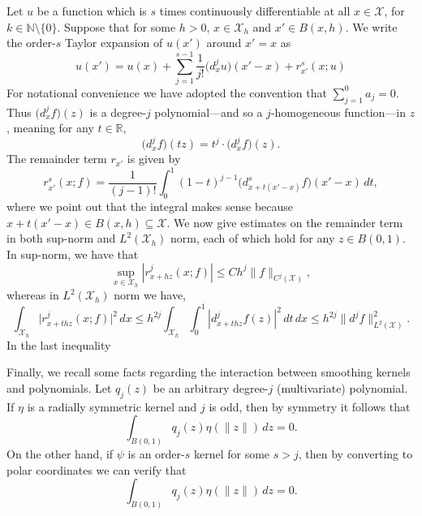 \documentclass[aos]{imsart}
\theoremstyle{plain}
\theoremstyle{definition}
\theoremstyle{remark}
\def\R{\mathbb{R}}
\newcommand{\mc}[1]{\mathcal{#1}}
\newcommand{\Reals}{\mathbb{R}} %
\newcommand{\1}{\mathbf{1}}
\begin{document}
Let $u$ be a function which is $s$ times continuously differentiable at all $x \in \mc{X}$, for $k \in \mathbb{N}\setminus\{0\}$. Suppose that for some $h > 0$, $x \in \mc{X}_{h}$ and $x' \in B(x,h)$. We write the order-$s$ Taylor expansion of $u(x')$ around $x' = x$ as
\begin{equation*}
u(x') = u(x) + \sum_{j = 1}^{s - 1} \frac{1}{j!}\bigl(d_x^{j}u\bigr)(x' - x) + r_{x'}^{s}(x;u)
\end{equation*}
For notational convenience we have adopted the convention that $\sum_{j = 1}^{0} a_j = 0$.  Thus $\bigl(d_x^{j}f\bigr)(z)$ is a degree-$j$ polynomial---and so a $j$-homogeneous function---in $z$, meaning for any $t \in \Reals$,
\begin{equation*}
\bigl(d_x^{j}f\bigr)(tz) = t^{j} \cdot \bigl(d_x^{j}f\bigr)(z).
\end{equation*}
The remainder term $r_{x'}$ is given by
\begin{equation*}
r_{x'}^s(x;f) = \frac{1}{(j - 1)!} \int_{0}^{1}(1 - t)^{j - 1} \bigl(d_{x + t(x' - x)}^{s}f\bigr)(x' - x) \,dt,
\end{equation*}
where we point out that the integral makes sense because $x + t(x' - x) \in B(x,h) \subseteq \mc{X}$. We now give estimates on the remainder term in both sup-norm and $L^2(\mc{X}_{h})$ norm, each of which hold for any $z \in B(0,1)$. In sup-norm, we have that 
\begin{equation*}
\sup_{x \in \mc{X}_{h}}|r_{x + hz}^j(x;f)| \leq C h^j \|f\|_{C^j(\mc{X})},
\end{equation*}
whereas in $L^2(\mc{X}_{h})$ norm we have,
\begin{equation}
\label{eqn:sobolev_remainder_term}
\int_{\mc{X}_{h}} \bigl|r_{x + thz}^j(x;f)\bigr|^2 \,dx \leq h^{2j} \int_{\mc{X}_{h}} \int_{0}^{1} |d_{x + thz}^jf(z)|^2 \,dt \,dx \leq h^{2j} \|d^jf\|_{L^2(\mc{X})}^2.
\end{equation}
In the last inequality 

Finally, we recall some facts regarding the interaction between smoothing kernels and polynomials.  Let $q_j(z)$ be an arbitrary degree-$j$ (multivariate) polynomial. If $\eta$ is a radially symmetric kernel and $j$ is odd, then by symmetry it follows that
\begin{equation*}
\int_{B(0,1)} q_j(z) \eta(\|z\|) \,dz = 0.
\end{equation*}
On the other hand, if $\psi$ is an order-$s$ kernel for some $s > j$, then by converting to polar coordinates we can verify that
\begin{equation*}
\int_{B(0,1)} q_j(z) \eta(\|z\|) \,dz = 0.
\end{equation*}
\end{document}
